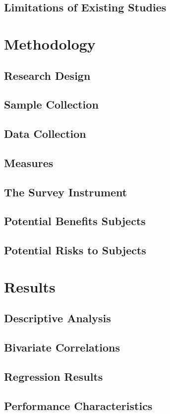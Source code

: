 \documentclass[12pt]{report}
\begin{document}
\section{Limitations of Existing Studies}
\lipsum[31-37]

\chapter{Methodology}
\section{Research Design}
\section{Sample Collection}
\section{Data Collection}
\section{Measures}
\section{The Survey Instrument}
\section{Potential Benefits Subjects}
\section{Potential Risks to Subjects}

\chapter{Results}
\section{Descriptive Analysis}
\section{Bivariate Correlations}
\section{Regression Results}
\section{Performance Characteristics}
\end{document}
